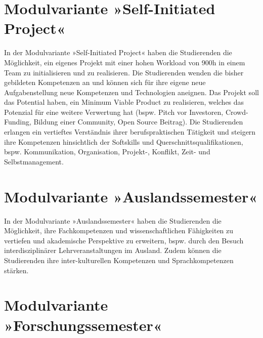 \hypertarget{modulvariante-self-initiated-projectpathlabel....srcmodulbeschreibungen-bachelor-bpo5ba_praxissemester}{%
\section*{Modulvariante »Self-Initiated
Project«\label{../../src/modulbeschreibungen-bachelor-bpo5/BA_Praxissemester}}\label{modulvariante-self-initiated-projectpathlabel....srcmodulbeschreibungen-bachelor-bpo5ba_praxissemester}}

In der Modulvariante »Self-Initiated Project« haben die Studierenden die
Möglichkeit, ein eigenes Projekt mit einer hohen Workload von 900h in
einem Team zu initialisieren und zu realisieren. Die Studierenden wenden
die bisher gebildeten Kompetenzen an und können sich für ihre eigene
neue Aufgabenstellung neue Kompetenzen und Technologien aneignen. Das
Projekt soll das Potential haben, ein Minimum Viable Product zu
realisieren, welches das Potenzial für eine weitere Verwertung hat
(bspw. Pitch vor Investoren, Crowd-Funding, Bildung einer Community,
Open Source Beitrag). Die Studierenden erlangen ein vertieftes
Verständnis ihrer berufspraktischen Tätigkeit und steigern ihre
Kompetenzen hinsichtlich der Softskills und Querschnittsqualifikationen,
bspw. Kommunikation, Organisation, Projekt-, Konflikt, Zeit- und
Selbstmanagement.

\hypertarget{modulvariante-auslandssemesterpathlabel....srcmodulbeschreibungen-bachelor-bpo5ba_praxissemester}{%
\section*{Modulvariante
»Auslandssemester«\label{../../src/modulbeschreibungen-bachelor-bpo5/BA_Praxissemester}}\label{modulvariante-auslandssemesterpathlabel....srcmodulbeschreibungen-bachelor-bpo5ba_praxissemester}}

In der Modulvariante »Auslandssemester« haben die Studierenden die
Möglichkeit, ihre Fachkompetenzen und wissenschaftlichen Fähigkeiten zu
vertiefen und akademische Perspektive zu erweitern, bspw. durch den
Besuch interdisziplinärer Lehrveranstaltungen im Ausland. Zudem können
die Studierenden ihre inter-kulturellen Kompetenzen und
Sprachkompetenzen stärken.

\hypertarget{modulvariante-forschungssemesterpathlabel....srcmodulbeschreibungen-bachelor-bpo5ba_praxissemester}{%
\section*{Modulvariante
»Forschungssemester«\label{../../src/modulbeschreibungen-bachelor-bpo5/BA_Praxissemester}}\label{modulvariante-forschungssemesterpathlabel....srcmodulbeschreibungen-bachelor-bpo5ba_praxissemester}}

